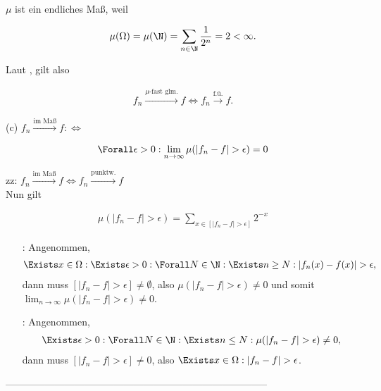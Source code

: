 $\mu$ ist ein endliches Maß, weil

\begin{align*}
  \mu(\Omega) = \mu(\N) = \sum_{n \in \N} \frac{1}{2^n} = 2 < \infty.
\end{align*}

Laut , gilt also

\begin{align*}
  f_n \xrightarrow{\mu \text{-fast glm.}} f
  \Leftrightarrow
  f_n \xrightarrow{\text{f.ü.}} f.
\end{align*}

(c) $f_n \xrightarrow{\text{im Maß}} f : \Leftrightarrow$

\begin{align*}
  \Forall \epsilon > 0:
  \lim_{n \to \infty} \mu(|f_n - f| > \epsilon) = 0
\end{align*}

zz: $f_n \xrightarrow{\text{im Maß}} f \Leftrightarrow f_n \xrightarrow{\text{punktw.}} f$ \\

Nun gilt

\begin{align*}
  \mu(|f_n - f| > \epsilon)
  =
  \sum_{x \in [|f_n - f| > \epsilon]} 2^{-x}
\end{align*}

\begin{itemize}

  \item[\Quote{$\Rightarrow$}:] Angenommen,
  \begin{align*}
    \Exists x \in \Omega:
    \Exists \epsilon > 0:
    \Forall N \in \N:
    \Exists n \geq N:
    |f_n(x) - f(x)| > \epsilon,
  \end{align*}
  dann muss $[|f_n - f| > \epsilon] \neq \emptyset$, also $\mu(|f_n - f| > \epsilon) \neq 0$ und somit $\lim_{n \to \infty} \mu(|f_n - f| > \epsilon) \neq 0$.

  \item[\Quote{$\Leftarrow$}:] Angenommen,
  \begin{align*}
    \Exists \epsilon > 0:
    \Forall N \in \N:
    \Exists n \leq N:
    \mu(|f_n - f| > \epsilon) \neq 0,
  \end{align*}
  dann muss $[|f_n - f| > \epsilon] \neq 0$, also $\Exists x \in \Omega: |f_n - f| > \epsilon$.

\end{itemize}

--------------------------------------------------------------------------------

